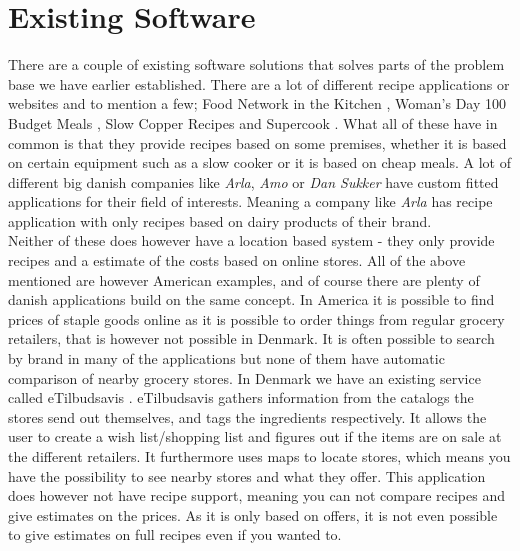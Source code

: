 \section{Existing Software}
\label{sec:exsoft}

There are a couple of existing software solutions that solves parts of the problem base we have earlier established. There are a lot of different recipe applications or websites and to mention a few;  Food Network in the Kitchen \cite{recipe_FN}, Woman's Day 100 Budget Meals \cite{recipe_woman}, Slow Copper Recipes \cite{recipe_SC} and Supercook \cite{recipe_supercook}. What all of these have in common is that they provide recipes based on some premises, whether it is based on certain equipment such as a slow cooker or it is based on cheap meals. A lot of different big danish companies like \textit{Arla}, \textit{Amo} or \textit{Dan Sukker} have custom fitted applications for their field of interests. Meaning a company like \textit{Arla} has recipe application with only recipes based on dairy products of their brand.\\
Neither of these does however have a location based system - they only provide recipes and a estimate of the costs based on online stores. All of the above mentioned are however American examples, and of course there are plenty of danish applications build on the same concept. In America it is possible to find prices of staple goods online as it is possible to order things from regular grocery retailers, that is however not possible in Denmark. It is often possible to search by brand in many of the applications but none of them have automatic comparison of nearby grocery stores. In Denmark we have an existing service called eTilbudsavis \cite{etilbudsavis}. eTilbudsavis gathers information from the catalogs the stores send out themselves, and tags the ingredients respectively. It allows the user to create a wish list/shopping list and figures out if the items are on sale at the different retailers. It furthermore uses maps to locate stores, which means you have the possibility to see nearby stores and what they offer. This application does however not have recipe support, meaning you can not compare recipes and give estimates on the prices. As it is only based on offers, it is not even possible to give estimates on full recipes even if you wanted to.
